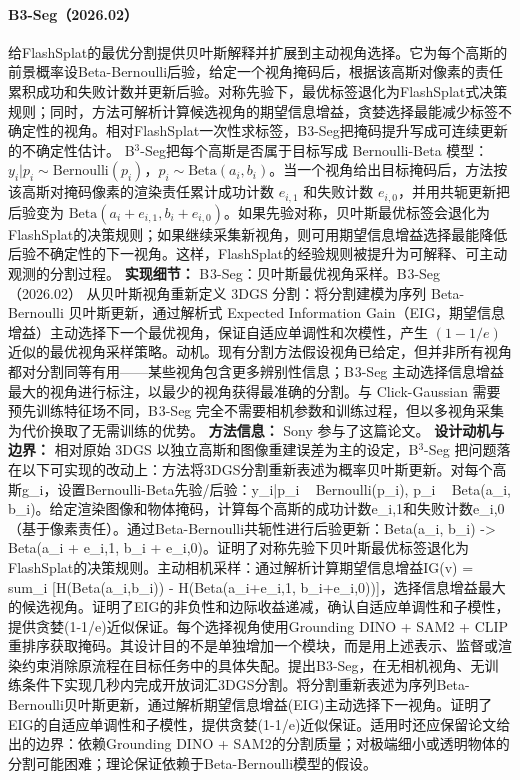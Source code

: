 \paragraph{B3-Seg（2026.02）\cite{2602_17134}}
给FlashSplat的最优分割提供贝叶斯解释并扩展到主动视角选择。它为每个高斯的前景概率设Beta-Bernoulli后验，给定一个视角掩码后，根据该高斯对像素的责任累积成功和失败计数并更新后验。对称先验下，最优标签退化为FlashSplat式决策规则；同时，方法可解析计算候选视角的期望信息增益，贪婪选择最能减少标签不确定性的视角。相对FlashSplat一次性求标签，B3-Seg把掩码提升写成可连续更新的不确定性估计。
B$^3$-Seg把每个高斯是否属于目标写成 Bernoulli-Beta 模型：$y_i|p_i \sim \mathrm{Bernoulli}(p_i)$，$p_i \sim \mathrm{Beta}(a_i,b_i)$。当一个视角给出目标掩码后，方法按该高斯对掩码像素的渲染责任累计成功计数 $e_{i,1}$ 和失败计数 $e_{i,0}$，并用共轭更新把后验变为 $\mathrm{Beta}(a_i+e_{i,1},b_i+e_{i,0})$。如果先验对称，贝叶斯最优标签会退化为FlashSplat的决策规则；如果继续采集新视角，则可用期望信息增益选择最能降低后验不确定性的下一视角。这样，FlashSplat的经验规则被提升为可解释、可主动观测的分割过程。
\textbf{实现细节：} B$^{}3$-Seg：贝叶斯最优视角采样。B$^{}3$-Seg（2026.02） 从贝叶斯视角重新定义 3DGS 分割：将分割建模为序列 Beta-Bernoulli 贝叶斯更新，通过解析式 Expected Information Gain（EIG，期望信息增益）主动选择下一个最优视角，保证自适应单调性和次模性，产生 $(1-1/e)$ 近似的最优视角采样策略。动机。现有分割方法假设视角已给定，但并非所有视角都对分割同等有用——某些视角包含更多辨别性信息；B$^{}3$-Seg 主动选择信息增益最大的视角进行标注，以最少的视角获得最准确的分割。与 Click-Gaussian 需要预先训练特征场不同，B$^{}3$-Seg 完全不需要相机参数和训练过程，但以多视角采集为代价换取了无需训练的优势。
\textbf{方法信息：} Sony 参与了这篇论文。
\textbf{设计动机与边界：} 相对原始 3DGS 以独立高斯和图像重建误差为主的设定，B$^3$-Seg 把问题落在以下可实现的改动上：方法将3DGS分割重新表述为概率贝叶斯更新。对每个高斯g\_i，设置Bernoulli-Beta先验/后验：y\_i|p\_i ~ Bernoulli(p\_i), p\_i ~ Beta(a\_i, b\_i)。给定渲染图像和物体掩码，计算每个高斯的成功计数e\_i,1和失败计数e\_i,0（基于像素责任）。通过Beta-Bernoulli共轭性进行后验更新：Beta(a\_i, b\_i) -> Beta(a\_i + e\_i,1, b\_i + e\_i,0)。证明了对称先验下贝叶斯最优标签退化为FlashSplat的决策规则。主动相机采样：通过解析计算期望信息增益IG(v) = sum\_i [H(Beta(a\_i,b\_i)) - H(Beta(a\_i+e\_i,1, b\_i+e\_i,0))]，选择信息增益最大的候选视角。证明了EIG的非负性和边际收益递减，确认自适应单调性和子模性，提供贪婪(1-1/e)近似保证。每个选择视角使用Grounding DINO + SAM2 + CLIP重排序获取掩码。其设计目的不是单独增加一个模块，而是用上述表示、监督或渲染约束消除原流程在目标任务中的具体失配。提出B3-Seg，在无相机视角、无训练条件下实现几秒内完成开放词汇3DGS分割。将分割重新表述为序列Beta-Bernoulli贝叶斯更新，通过解析期望信息增益(EIG)主动选择下一视角。证明了EIG的自适应单调性和子模性，提供贪婪(1-1/e)近似保证。适用时还应保留论文给出的边界：依赖Grounding DINO + SAM2的分割质量；对极端细小或透明物体的分割可能困难；理论保证依赖于Beta-Bernoulli模型的假设。
